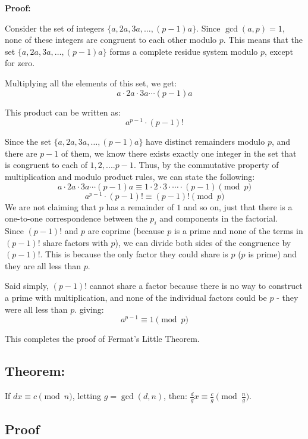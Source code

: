 \documentclass{article}
\begin{document}
\textbf{Proof:}

Consider the set of integers \(\{a, 2a, 3a, \ldots, (p-1)a\}\). Since \( \gcd(a, p) = 1 \), none of these integers are congruent to each other modulo \( p \). This means that the set \(\{a, 2a, 3a, \ldots, (p-1)a\}\) forms a complete residue system modulo \( p \), except for zero.

Multiplying all the elements of this set, we get:
\[
a \cdot 2a \cdot 3a \cdots (p-1)a
\]

This product can be written as:
\[
a^{p-1} \cdot (p-1)!
\]

Since the set \(\{a, 2a, 3a, \ldots, (p-1)a\}\) have distinct remainders modulo \( p \), and there are $p-1$ of them, we know there exists exactly one integer in the set that is congruent to each of $1,2,....p-1$. Thus, by the commutative property of multiplication and modulo product rules, we can state the following:
\[
a \cdot 2a \cdot 3a \cdots (p-1)a \equiv 1 \cdot 2 \cdot 3 \cdot \cdots \cdot (p-1) \pmod{p}
\]
\[
a^{p-1} \cdot (p-1)! \equiv (p-1)! \pmod{p}
\]
We are not claiming that $p$ has a remainder of $1$ and so on, just that there is a one-to-one correspondence between the $p_i$ and components in the factorial.
\\

Since \((p-1)!\) and \( p \) are coprime (because \( p \) is a prime and none of the terms in \((p-1)!\) share factors with \( p \)), we can divide both sides of the congruence by \((p-1)!\). This is because the only factor they could share is $p$ ($p$ is prime) and they are all less than $p$.

Said simply, $(p-1)!$ cannot share a factor because there is no way to construct a prime with multiplication, and none of the individual factors could be $p$ - they were all less than $p$.
giving:
\[
a^{p-1} \equiv 1 \pmod{p}
\]

This completes the proof of Fermat's Little Theorem.


\subsection*{Theorem:}
If  \( dx \equiv c \pmod{n} \), letting \( g = \gcd(d, n) \), then:
     \( \frac{d}{g} x \equiv \frac{c}{g} \pmod{\frac{n}{g}} \).

\subsection*{Proof}
\end{document}
